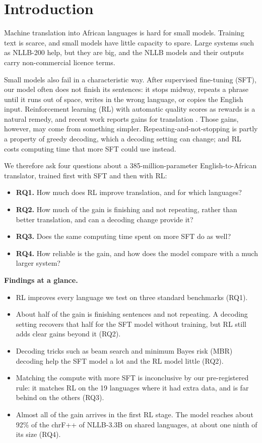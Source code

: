 \section{Introduction}\label{sec:intro}
Machine translation into African languages is hard for small models. Training text is scarce, and small models have little capacity to spare. Large systems such as NLLB-200 \citep{nllb2022nllb} help, but they are big, and the NLLB models and their outputs carry non-commercial licence terms.

Small models also fail in a characteristic way. After supervised fine-tuning (SFT), our model often does not finish its sentences: it stops midway, repeats a phrase until it runs out of space, writes in the wrong language, or copies the English input. Reinforcement learning (RL) with automatic quality scores as rewards is a natural remedy, and recent work reports gains for translation \citep{shao2024deepseekmath,feng2025mtr1zero,finkelstein2026translategemma}. Those gains, however, may come from something simpler. Repeating-and-not-stopping is partly a property of greedy decoding, which a decoding setting can change; and RL costs computing time that more SFT could use instead.

We therefore ask four questions about a 385-million-parameter English-to-African translator, trained first with SFT and then with RL:
\begin{itemize}
\item \textbf{RQ1.} How much does RL improve translation, and for which languages?
\item \textbf{RQ2.} How much of the gain is finishing and not repeating, rather than better translation, and can a decoding change provide it?
\item \textbf{RQ3.} Does the same computing time spent on more SFT do as well?
\item \textbf{RQ4.} How reliable is the gain, and how does the model compare with a much larger system?
\end{itemize}

\textbf{Findings at a glance.}
\begin{itemize}
\item RL improves every language we test on three standard benchmarks (RQ1).
\item About half of the gain is finishing sentences and not repeating. A decoding setting recovers that half for the SFT model without training, but RL still adds clear gains beyond it (RQ2).
\item Decoding tricks such as beam search and minimum Bayes risk (MBR) decoding help the SFT model a lot and the RL model little (RQ2).
\item Matching the compute with more SFT is inconclusive by our pre-registered rule: it matches RL on the 19 languages where it had extra data, and is far behind on the others (RQ3).
\item Almost all of the gain arrives in the first RL stage. The model reaches about 92\% of the chrF++ of NLLB-3.3B on shared languages, at about one ninth of its size (RQ4).
\end{itemize}

